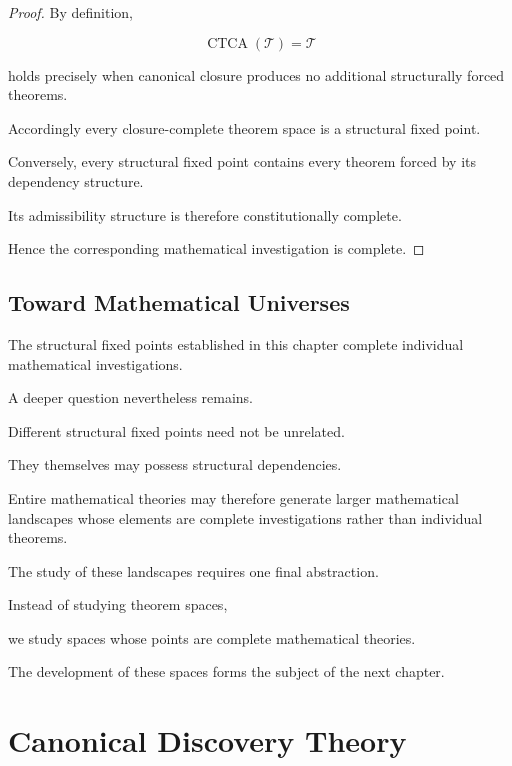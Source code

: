 \documentclass[13pt,openany]{book}
\theoremstyle{plain}
\theoremstyle{definition}
\begin{document}
\begin{proof}

By definition,

\[
\operatorname{CTCA}(\mathcal T)
=
\mathcal T
\]

holds precisely when canonical closure produces no additional structurally
forced theorems.

Accordingly every closure-complete theorem space is a structural fixed point.

Conversely, every structural fixed point contains every theorem forced by its
dependency structure.

Its admissibility structure is therefore constitutionally complete.

Hence the corresponding mathematical investigation is complete.

\end{proof}

\section{Toward Mathematical Universes}

The structural fixed points established in this chapter complete individual
mathematical investigations.

A deeper question nevertheless remains.

Different structural fixed points need not be unrelated.

They themselves may possess structural dependencies.

Entire mathematical theories may therefore generate larger mathematical
landscapes whose elements are complete investigations rather than individual
theorems.

The study of these landscapes requires one final abstraction.

Instead of studying theorem spaces,

we study spaces whose points are complete mathematical theories.

The development of these spaces forms the subject of the next chapter.

\chapter{Canonical Discovery Theory}
\end{document}

